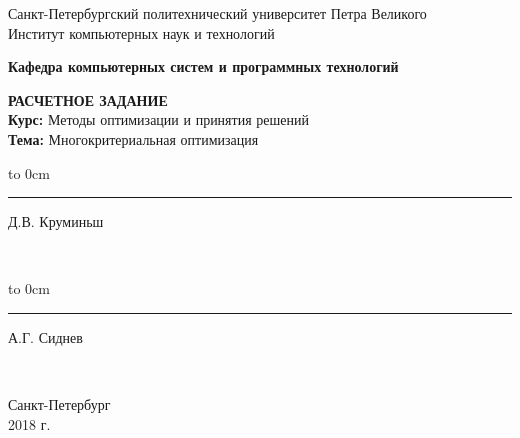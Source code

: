 	\begin{titlepage}
		\begin{center}
			\large {Санкт-Петербургский политехнический университет Петра Великого\\
				Институт компьютерных наук и технологий}\\
		\end{center}
		\begin{center}
			\large\textbf {Кафедра компьютерных систем и программных технологий}
		\end{center}
		\vfill
		\begin{center}
			\large{\textbf{РАСЧЕТНОЕ ЗАДАНИЕ} \\
			\textbf{Курс: } Методы оптимизации и принятия решений\\
			\textbf{Тема: } Многокритериальная оптимизация}
		\end{center}
		
		\vfill
		
		\hfill\parbox{9 cm}{\hspace*{3cm}\hbox to 0cm{\raisebox{-1em}{\small(подпись)}}\hspace*{-0.8cm}\rule{3cm}{0.8pt} Д.В. Круминьш}\\[0.6cm]
		
		 \hfill\parbox{9 cm}{\hspace*{3cm}\hbox to 0cm{\raisebox{-1em}{\small(подпись)}}\hspace*{-0.8cm}\rule{3cm}{0.8pt} А.Г. Сиднев}\\[0.6cm]
		
		\vspace{\fill}
		\begin{center}
			Санкт-Петербург \\ 2018 г.
		\end{center}
	\end{titlepage}
\setcounter{page}{2}